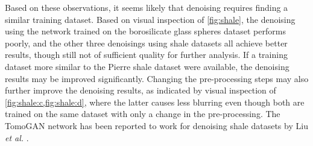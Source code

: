 Based on these observations, it seems likely that denoising requires finding a similar training dataset. Based on visual inspection of \cref{fig:shale}, the denoising using the network trained on the borosilicate glass spheres dataset performs poorly, and the other three denoisings using shale datasets all achieve better results, though still not of sufficient quality for further analysis. If a training dataset more similar to the Pierre shale dataset were available, the denoising results may be improved significantly. Changing the pre-processing steps may also further improve the denoising results, as indicated by visual inspection of \cref{fig:shale:c,fig:shale:d}, where the latter causes less blurring even though both are trained on the same dataset with only a change in the pre-processing. The TomoGAN network has been reported to work for denoising shale datasets by Liu \textit{et al.} \cite{liu2020tomogan}. 